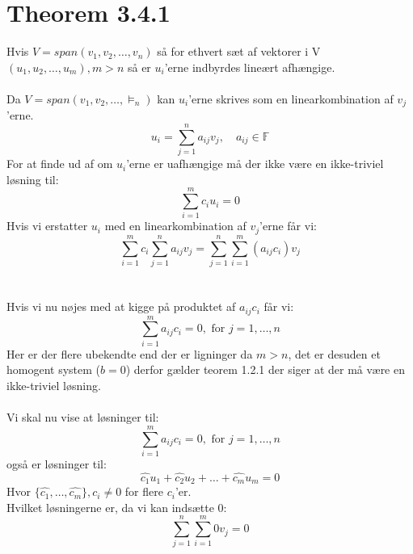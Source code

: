 \documentclass[a4paper,oneside,article]{memoir}
\begin{document}
	 \section{Theorem 3.4.1}
	 Hvis $V=span(v_1,v_2,\dots,v_n)$ så for ethvert sæt af vektorer 
	 i V $(u_1,u_2,\dots,u_m), m>n$ så er $u_i$'erne indbyrdes
	 lineært afhængige.
	 \\
	 \\
	 Da $V=span(v_1,v_2,\dots,\vDash_n)$ kan $u_i$'erne skrives 
	 som en linearkombination af $v_j$'erne.
	 $$u_i=\sum\limits_{j=1}^{n}a_{ij}v_j, \quad a_{ij}\in \mathbb{F}$$
	 For at finde ud af om $u_i$'erne er uafhængige må der ikke
	 være en ikke-triviel løsning til:
	 $$\sum\limits_{i=1}^{m}c_iu_i=0$$
	 Hvis vi erstatter $u_i$ med en linearkombination af $v_j$'erne 
	 får vi:
	 $$\sum\limits_{i=1}^{m}c_i\sum\limits_{j=1}^{n}a_{ij}v_j=
	 \sum\limits_{j=1}^{n}\sum\limits_{i=1}^{m}(a_{ij}c_i)v_j$$
	 \\
	 \\
	 Hvis vi nu nøjes med at kigge på produktet af $a_{ij}c_i$
	 får vi:
	 $$\sum\limits_{i=1}^{m}a_{ij}c_i=0,\text{ for } j=1,\dots,n$$
	 Her er der flere ubekendte end der er ligninger da $m>n$,
	 det er desuden et homogent system ($b=0$) derfor gælder
	 teorem 1.2.1 der siger at der må være en ikke-triviel
	 løsning.
	 \\
	 \\
	 Vi skal nu vise at løsninger til:
	 $$\sum\limits_{i=1}^{m}a_{ij}c_i=0,\text{ for } j=1,\dots,n$$
	 også er løsninger til:
	 $$\hat{c_1}u_1+\hat{c_2}u_2+\dots+\hat{c_m}u_m=0$$
	 Hvor $\{\hat{c_1},\dots,\hat{c_m}\}, c_i \neq 0$ for flere 
	 $c_i$'er.\\
	 Hvilket løsningerne er, da vi kan indsætte 0:
	 $$\sum\limits_{j=1}^{n}\sum\limits_{i=1}^{m}0v_j=0$$
    
    
\end{document}

